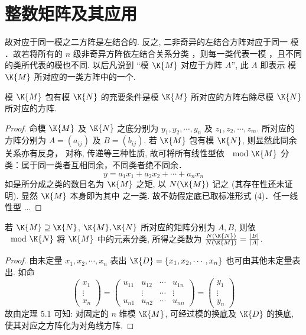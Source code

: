 \documentclass[lang=cn]{ztex}
\begin{document}
\zaliasOn
\section{整数矩阵及其应用}
故对应于同一模之二方阵是左结合的. 反之, 二非奇异的左结合方阵对应于同一
模 ．故若将所有的 $n$ 级非奇异方阵依左结合关系分类 ，则每一类代表一模 ，且不同
的类所代表的模也不同. 以后凡说到 ``模 $\K{M}$ 对应于方阵 $A$'', 此 $A$ 即表示
模 $\K{M}$ 所对应的一类方阵中的一个.


\begin{theorem}
  模 $\K{M}$ 包有模 $\K{N}$ 的充要条件是模 $\K{M}$ 所对应的方阵右除尽模 $\K{N}$ 所对应的方阵.
\end{theorem}

\begin{proof}
  命模 $\K{M}$ 及 $\K{N}$ 之底分别为 $y_1, y_2, \cdots, y_n$ 及 $z_1, z_2, \cdots, z_m$.
  所对应的方阵分别为 $A=(a_{ij})$ 及 $B=(b_{ij})$. 若 $\K{M}$ 包有模 $\K{N}$, 则显然此同余关系亦有反身，
  对称, 传递等三种性质, 故可将所有线性型依\hspace{-8pt} $\mod\K{M}$ 分类：属于同一类者互相同余，不同类者绝不同余．
  \[
    y = a_1x_1 + a_2x_2 + \cdots + a_nx_n
  \]
  如是所分成之类的数目名为 $\K{M}$ 之矩, 以 $N(\K{M})$ 记之 (其存在性还未证明). 显然 $\K{M}$ 本身即为其中
  之一类. 故不妨假定底已取标准形式 (4)．任一线性型 ...
\end{proof}


\begin{theorem}
  若 $\K{M}\supseteq \K{N}$, $\K{M}, \K{N}$ 所对应的矩阵分别为 $A, B$, 则依\hspace{-8pt} $\mod\K{N}$ 将 $\K{M}$ 
  中的元素分类, 所得之类数为 $\frac{N(\K{N})}{N(\K{M})} = \frac{|B|}{|A|}$.
\end{theorem}
\begin{proof}
  由未定量 $x_1, x_2, \cdots, x_n$ 表出 $\K{D} = \{x_1, x_2, \cdots, x_n\}$ 也可由其他未定量表出. 如命
  \[\begin{pmatrix}
    x_1\\
    \vdots\\
    x_n
  \end{pmatrix}
  = \begin{pmatrix}
    u_{11} & u_{12} & \cdots & u_{1n}\\
    & \vdots & \cdots & \vdots\\
    u_{n1} & u_{n2} & \cdots & u_{nn}
  \end{pmatrix}
  = \begin{pmatrix}
    y_1\\
    \vdots\\
    y_n
  \end{pmatrix}
\]
故由定理 5.1 可知: 对固定的 $n$ 维模 $\K{M}$, 可经过模的换底及 $\K{D}$ 的换底, 
使其对应之方阵化为对角线方阵.
\end{proof}
\end{document}
